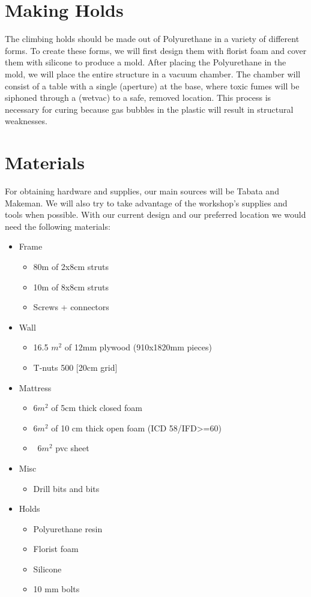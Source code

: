 \documentclass{scrartcl}
\begin{document}
\section{Making Holds}
The climbing holds should be made out of Polyurethane in a variety of different forms. To create these forms, we will first design them with florist foam and cover them with silicone to produce a mold. After placing the Polyurethane in the mold, we will place the entire structure in a vacuum chamber. The chamber will consist of a table with a single (aperture) at the base, where toxic fumes will be siphoned through a (wetvac) to a safe, removed location. This process is necessary for curing because gas bubbles in the plastic will result in structural weaknesses. 

\section{Materials}
For obtaining hardware and supplies, our main sources will be Tabata and Makeman. We will also try to take advantage of the workshop’s supplies and tools when possible.
With our current design and our preferred location we would need the following materials:

\begin{itemize}
\item Frame
\begin{itemize}
\item 80m of 2x8cm struts 
\item 10m of 8x8cm struts
\item Screws + connectors
\end{itemize}
\item Wall
\begin{itemize}
\item 16.5 $m^2$ of 12mm plywood (910x1820mm pieces)
\item T-nuts 500 [20cm grid]
\end{itemize}
\item Mattress
\begin{itemize}
\item 6$m^2$ of 5cm thick closed foam
\item 6$m^2$ of 10 cm thick open foam (ICD 58/IFD>=60)
\item ~6$m^2$ pvc sheet
\end{itemize}
\item Misc
\begin{itemize}
\item Drill bits and bits
\end{itemize}
\item Holds
\begin{itemize}
\item Polyurethane resin
\item Florist foam
\item Silicone 
\item 10 mm bolts
\end{itemize}
\end{itemize}
\end{document}
